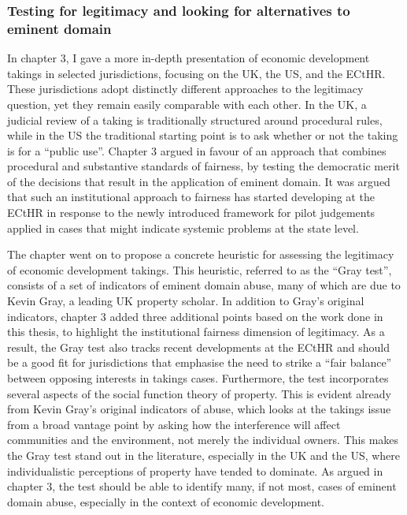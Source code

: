 \subsubsection*{Testing for legitimacy and looking for alternatives to eminent domain}

In chapter 3, I gave a more in-depth presentation of economic development takings in selected jurisdictions, focusing on the UK, the US, and the ECtHR. These jurisdictions adopt distinctly different approaches to the legitimacy question, yet they remain easily comparable with each other. In the UK, a judicial review of a taking is traditionally structured around procedural rules, while in the US the traditional starting point is to ask whether or not the taking is for a ``public use''. Chapter 3 argued in favour of an approach that combines procedural and substantive standards of fairness, by testing the democratic merit of the decisions that result in the application of eminent domain. It was argued that such an institutional approach to fairness has started developing at the ECtHR in response to the newly introduced framework for pilot judgements applied in cases that might indicate systemic problems at the state level.

The chapter went on to propose a concrete heuristic for assessing the legitimacy of economic development takings. This heuristic, referred to as the ``Gray test'', consists of a set of indicators of eminent domain abuse, many of which are  due to Kevin Gray, a leading UK property scholar. In addition to Gray's original indicators, chapter 3 added three additional points based on the work done in this thesis, to highlight the institutional fairness dimension of legitimacy. As a result, the Gray test also tracks recent developments at the ECtHR and should be a good fit for jurisdictions that emphasise the need to strike a ``fair balance'' between opposing interests in takings cases. Furthermore, the test incorporates several aspects of the social function theory of property. This is evident already from Kevin Gray's original indicators of abuse, which looks at the takings issue from a broad vantage point by asking how the interference will affect communities and the environment, not merely the individual owners. This makes the Gray test stand out in the literature, especially in the UK and the US, where individualistic perceptions of property have tended to dominate. As argued in chapter 3, the test should be able to identify many, if not most, cases of eminent domain abuse, especially in the context of economic development.

